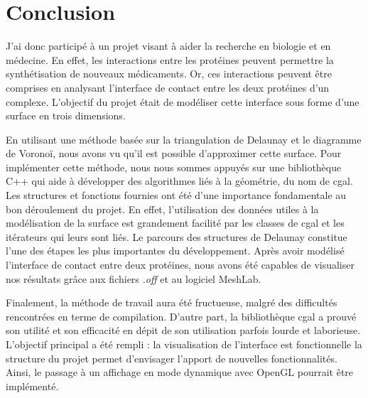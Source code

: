\chapter*{Conclusion}

J'ai donc participé à un projet visant à aider la recherche en biologie et en médecine.
En effet, les interactions entre les protéines peuvent permettre la synthétisation de
nouveaux médicaments. Or, ces interactions peuvent être comprises en analysant l'interface
de contact entre les deux protéines d'un complexe. L'objectif du projet était de modéliser
cette interface sous forme d'une surface en trois dimensions.

En utilisant une méthode basée sur la triangulation de Delaunay et le diagramme de
Voronoï, nous avons vu qu'il est possible d'approximer cette surface.
Pour implémenter cette méthode, nous nous sommes appuyés sur une bibliothèque C++ qui
aide à développer des algorithmes liés à la géométrie, du nom de \gls{cgal}. Les structures et fonctions fournies
ont été d'une importance fondamentale au bon déroulement du projet. En effet, l'utilisation
des données utiles à la modélisation de la surface est grandement facilité par les classes de \gls{cgal}
et les itérateurs qui leurs sont liés. Le parcours des structures de Delaunay constitue
l'une des étapes les plus importantes du développement.
Après avoir modélisé l'interface de contact entre deux protéines, nous avons été capables
de visualiser nos résultats grâce aux fichiers \textit{.off} et au logiciel MeshLab.

Finalement, la méthode de travail aura été fructueuse, malgré des difficultés rencontrées
en terme de compilation. D'autre part, la bibliothèque \gls{cgal} a prouvé son utilité
et son efficacité en dépit de son utilisation parfois lourde et laborieuse.
L'objectif principal a été rempli : la visualisation de l'interface est fonctionnelle
la structure du projet permet d'envisager l'apport de nouvelles fonctionnalités.
Ainsi, le passage à un affichage en mode dynamique avec OpenGL pourrait être
implémenté.

